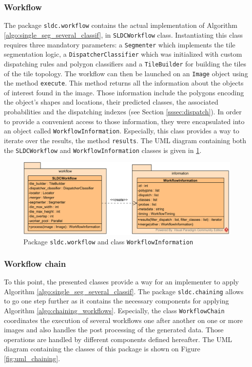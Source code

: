 \subsubsection{Workflow}

The package \texttt{sldc.workflow} contains the actual implementation of Algorithm \ref{algo:single_seg_several_classif}, in \texttt{SLDCWorkflow} class. Instantiating this class requires three mandatory parameters: a \texttt{Segmenter} which implements the tile segmentation logic, a \texttt{DispatcherClassifier} which was initialized with custom dispatching rules and polygon classifiers and a \texttt{TileBuilder} for building the tiles of the tile topology. The workflow can then be launched on an \texttt{Image} object using the method \texttt{execute}. This method returns all the information about the objects of interest found in the image. Those information include the polygons encoding the object's shapes and locations, their predicted classes, the associated probabilities and the dispatching indexes (see Section \ref{sssec:dispatch}). In order to provide a convenient access to those information, they were encapsulated into an object called \texttt{WorkflowInformation}. Especially, this class provides a way to iterate over the results, the method \texttt{results}. The UML diagram containing both the \texttt{SLDCWorkflow} and \texttt{WorkflowInformation} classes is given in \ref{fig:uml_workflow}.

\begin{figure}
	\center
	\includegraphics[scale=0.75]{image/uml_workflow.png}
	\caption{Package \texttt{sldc.workflow} and class \texttt{WorkflowInformation}}
	\label{fig:uml_workflow}
\end{figure}

\subsubsection{Workflow chain}
To this point, the presented classes provide a way for an implementer to apply Algorithm \ref{algo:single_seg_several_classif}. The package \texttt{sldc.chaining} allows to go one step further as it contains the necessary components for applying Algorithm \ref{algo:chaining_workflows}. Especially, the class \texttt{WorkflowChain} coordinates the execution of several workflows one after another on one or more images and also handles the post processing of the generated data. Those operations are handled by different components defined hereafter. The UML diagram containing the classes of this package is shown on Figure \ref{fig:uml_chaining}.

